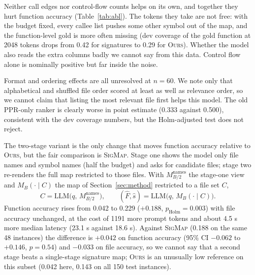 \documentclass[10pt]{article}
\newcommand{\sig}{\textsc{SigMap}}
\newcommand{\ours}{\textsc{Ours}}
\begin{document}
Neither call edges nor control-flow counts helps on its own, and together they hurt function accuracy (Table~\ref{tab:abl}). The tokens they take are not free: with the budget fixed, every callee list pushes some other symbol out of the map, and the function-level gold is more often missing (dev coverage of the gold function at 2048 tokens drops from 0.42 for signatures to 0.29 for \ours). Whether the model also reads the extra columns badly we cannot say from this data. Control flow alone is nominally positive but far inside the noise.

Format and ordering effects are all unresolved at $n=60$. We note only that alphabetical and shuffled file order scored at least as well as relevance order, so we cannot claim that listing the most relevant file first helps this model. The old PPR-only ranker is clearly worse in point estimate (0.333 against 0.500), consistent with the dev coverage numbers, but the Holm-adjusted test does not reject.

The two-stage variant is the only change that moves function accuracy relative to \ours{}, but the fair comparison is \sig{}. Stage one shows the model only file names and symbol names (half the budget) and asks for candidate files; stage two re-renders the full map restricted to those files. With $M^{\mathrm{names}}_{B/2}$ the stage-one view and $M_B(\cdot\mid C)$ the map of Section~\ref{sec:method} restricted to a file set $C$,
\begin{equation}\label{eq:twostage}
C=\mathrm{LLM}\bigl(q,\,M^{\mathrm{names}}_{B/2}\bigr),\qquad (\hat F,\hat s)=\mathrm{LLM}\bigl(q,\,M_B(\cdot\mid C)\bigr).
\end{equation}
Function accuracy rises from 0.042 to 0.229 ($+0.188$, $p_{\text{Holm}}=0.003$) with file accuracy unchanged, at the cost of 1191 more prompt tokens and about 4.5 s more median latency (23.1 s against 18.6 s). Against \sig{} (0.188 on the same 48 instances) the difference is $+0.042$ on function accuracy (95\% CI $-0.062$ to $+0.146$, $p=0.54$) and $-0.033$ on file accuracy, so we cannot say that a second stage beats a single-stage signature map; \ours{} is an unusually low reference on this subset (0.042 here, 0.143 on all 150 test instances).
\end{document}
